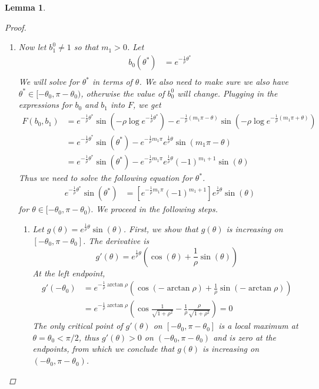 \documentclass[12pt]{article}
\newtheorem{lemma}{Lemma}
\begin{document}
\begin{lemma}
\begin{proof}
\begin{enumerate}
	\item Now let $b_1^0 \neq 1$ so that $m_1 > 0$. Let
	\begin{align*}
	b_0(\theta^*) &= e^{-\frac{1}{\rho} \theta^* } \\
	\end{align*}
	We will solve for $\theta^*$ in terms of $\theta$. We also need to make sure we also have $\theta^* \in [-\theta_0,\pi - \theta_0)$, otherwise the value of $b_0^0$ will change. Plugging in the expressions for $b_0$ and $b_1$ into $F$, we get
	\begin{align*}
	F(b_0, b_1) &= e^{ -\frac{1}{\rho}\theta^* } \sin\left( -\rho \log e^{ -\frac{1}{\rho}\theta^* }\right) - e^{ -\frac{1}{\rho}(m_1 \pi - \theta) }\sin \left( -\rho \log e^{ -\frac{1}{\rho}(m_1 \pi + \theta) } \right) \\
	&= e^{ -\frac{1}{\rho}\theta^* } \sin\left( \theta^* \right) - e^{ -\frac{1}{\rho} m_1 \pi} e^{ \frac{1}{\rho} \theta } \sin(m_1 \pi - \theta) \\
	&= e^{ -\frac{1}{\rho}\theta^* } \sin\left( \theta^* \right) - e^{ -\frac{1}{\rho} m_1 \pi } e^{ \frac{1}{\rho} \theta } (-1)^{m_1 + 1} \sin(\theta)
	\end{align*}
	Thus we need to solve the following equation for $\theta^*$.
	\begin{align}\label{thetastareq}
	e^{ -\frac{1}{\rho}\theta^* } \sin\left( \theta^* \right) &= \left[ e^{ -\frac{1}{\rho} m_1 \pi } (-1)^{m_1 + 1} \right] e^{ \frac{1}{\rho} \theta } \sin(\theta)
	\end{align}
	for $\theta \in [-\theta_0,\pi - \theta_0)$. We proceed in the following steps.
	\begin{enumerate}
		\item Let $g(\theta) = e^{ \frac{1}{\rho} \theta } \sin(\theta)$. First, we show that $g(\theta)$ is increasing on $[-\theta_0,\pi - \theta_0]$. The derivative is 
		\[
		g'(\theta) = e^{ \frac{1}{\rho} \theta } \left( \cos(\theta) + \frac{1}{\rho} \sin(\theta)\right)
		\]
		At the left endpoint,
		\begin{align*}
		g'(-\theta_0) &= e^{ -\frac{1}{\rho} \arctan \rho } \left(\cos(-\arctan \rho) + \frac{1}{\rho} \sin(-\arctan \rho)\right) \\
		&= e^{ -\frac{1}{\rho} \arctan \rho } \left(\cos\frac{1}{\sqrt{1 + \rho^2}} - \frac{1}{\rho} \frac{\rho}{\sqrt{1 + \rho^2}}\right) = 0
		\end{align*}
		The only critical point of $g'(\theta)$ on $[-\theta_0,\pi - \theta_0]$ is a local maximum at $\theta = \theta_0 < \pi/2$, thus $g'(\theta) > 0$ on $(-\theta_0,\pi - \theta_0)$ and is zero at the endpoints, from which we conclude that $g(\theta)$ is increasing on $(-\theta_0,\pi - \theta_0)$.
		

\end{enumerate}
\end{enumerate}
\end{proof}
\end{lemma}
\end{document}
